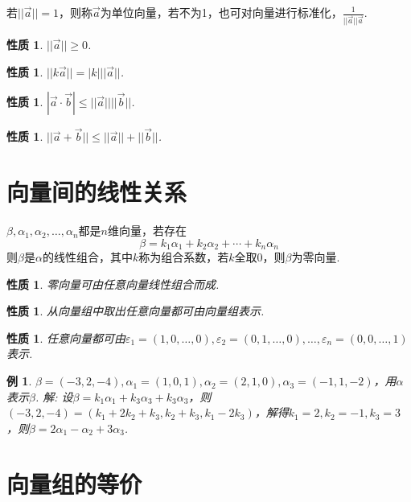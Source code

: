 \documentclass[12pt, a4paper, oneside]{ctexbook}
\newtheorem{example}[theorem]{例}
\newtheorem{quolity}[theorem]{性质}
\begin{document}
若$||\vec a||=1$，则称$\vec a$为单位向量，若不为1，也可对向量进行标准化，$\frac{1}{||\vec a|| \vec a}$. 

\begin{quolity}
    $||\vec a|| \ge 0$. 
\end{quolity}

\begin{quolity}
    $||k\vec a|| = |k|||\vec a||$. 
\end{quolity}

\begin{quolity}
    $|\vec a \cdot \vec b| \le ||\vec a|| ||\vec b||$. 
\end{quolity}

\begin{quolity}
    $||\vec a + \vec b|| \le ||\vec a|| + ||\vec b||$. 
\end{quolity}

\section{向量间的线性关系}

$\beta, \alpha_1, \alpha_2, \dots, \alpha_n$都是$n$维向量，若存在$$\beta = k_1\alpha_1 + k_2\alpha_2 + \cdots + k_n\alpha_n$$
则$\beta$是$\alpha$的线性组合，其中$k$称为组合系数，若$k$全取0，则$\beta$为零向量. 

\begin{quolity}
    零向量可由任意向量线性组合而成. 
\end{quolity}

\begin{quolity}
    从向量组中取出任意向量都可由向量组表示. 
\end{quolity}

\begin{quolity}
    任意向量都可由$\varepsilon_1 = (1,0,\dots,0), \varepsilon_2 = (0, 1, \dots, 0), \dots, \varepsilon_n = (0, 0, \dots, 1)$表示. 
\end{quolity}

\begin{example}
    $\beta = (-3, 2, -4), \alpha_1 = (1, 0, 1), \alpha_2 = (2, 1, 0), \alpha_3 = (-1, 1, -2)$，用$\alpha$表示$\beta$.
    \newline
    解: 设$\beta = k_1\alpha_1 + k_3\alpha_3 + k_3\alpha_3$，则$(-3, 2, -4) = (k_1 + 2k_2 + k_3, k_2 + k_3, k_1 - 2k_3)$，解得$k_1=2, k_2=-1, k_3=3$，则$\beta = 2\alpha_1 - \alpha_2 + 3\alpha_3$. 
\end{example}

\section{向量组的等价}
\end{document}
